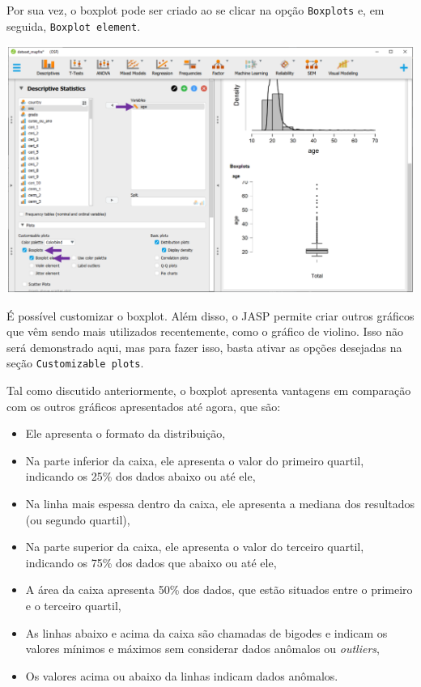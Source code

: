 \documentclass[
]{book}
\providecommand{\tightlist}{%
  \setlength{\itemsep}{0pt}\setlength{\parskip}{0pt}}
\begin{document}
Por sua vez, o boxplot pode ser criado ao se clicar na opção \texttt{Boxplots} e, em seguida, \texttt{Boxplot\ element}.

\includegraphics{./img/cap_desc_jasp_grafico_boxplot.png}

É possível customizar o boxplot. Além disso, o JASP permite criar outros gráficos que vêm sendo mais utilizados recentemente, como o gráfico de violino. Isso não será demonstrado aqui, mas para fazer isso, basta ativar as opções desejadas na seção \texttt{Customizable\ plots}.

Tal como discutido anteriormente, o boxplot apresenta vantagens em comparação com os outros gráficos apresentados até agora, que são:

\begin{itemize}
\tightlist
\item
  Ele apresenta o formato da distribuição,\\
\item
  Na parte inferior da caixa, ele apresenta o valor do primeiro quartil, indicando os 25\% dos dados abaixo ou até ele,\\
\item
  Na linha mais espessa dentro da caixa, ele apresenta a mediana dos resultados (ou segundo quartil),\\
\item
  Na parte superior da caixa, ele apresenta o valor do terceiro quartil, indicando os 75\% dos dados que abaixo ou até ele,\\
\item
  A área da caixa apresenta 50\% dos dados, que estão situados entre o primeiro e o terceiro quartil,\\
\item
  As linhas abaixo e acima da caixa são chamadas de bigodes e indicam os valores mínimos e máximos sem considerar dados anômalos ou \emph{outliers},\\
\item
  Os valores acima ou abaixo da linhas indicam dados anômalos.
\end{itemize}
\end{document}
